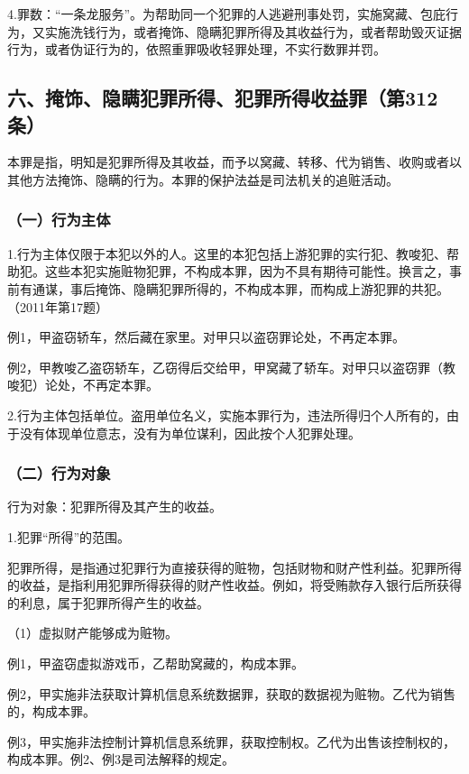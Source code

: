 4.罪数：“一条龙服务”。为帮助同一个犯罪的人逃避刑事处罚，实施窝藏、包庇行为，又实施洗钱行为，或者掩饰、隐瞒犯罪所得及其收益行为，或者帮助毁灭证据行为，或者伪证行为的，依照重罪吸收轻罪处理，不实行数罪并罚。

\subsection*{六、掩饰、隐瞒犯罪所得、犯罪所得收益罪（第312条）}

本罪是指，明知是犯罪所得及其收益，而予以窝藏、转移、代为销售、收购或者以其他方法掩饰、隐瞒的行为。本罪的保护法益是司法机关的追赃活动。

\subsubsection*{（一）行为主体}

1.行为主体仅限于本犯以外的人。这里的本犯包括上游犯罪的实行犯、教唆犯、帮助犯。这些本犯实施赃物犯罪，不构成本罪，因为不具有期待可能性。换言之，事前有通谋，事后掩饰、隐瞒犯罪所得的，不构成本罪，而构成上游犯罪的共犯。（2011年第17题）

例1，甲盗窃轿车，然后藏在家里。对甲只以盗窃罪论处，不再定本罪。

例2，甲教唆乙盗窃轿车，乙窃得后交给甲，甲窝藏了轿车。对甲只以盗窃罪（教唆犯）论处，不再定本罪。

2.行为主体包括单位。盗用单位名义，实施本罪行为，违法所得归个人所有的，由于没有体现单位意志，没有为单位谋利，因此按个人犯罪处理。

\subsubsection*{（二）行为对象}

行为对象：犯罪所得及其产生的收益。

1.犯罪“所得”的范围。

犯罪所得，是指通过犯罪行为直接获得的赃物，包括财物和财产性利益。犯罪所得的收益，是指利用犯罪所得获得的财产性收益。例如，将受贿款存入银行后所获得的利息，属于犯罪所得产生的收益。

（1）虚拟财产能够成为赃物。

例1，甲盗窃虚拟游戏币，乙帮助窝藏的，构成本罪。

例2，甲实施非法获取计算机信息系统数据罪，获取的数据视为赃物。乙代为销售的，构成本罪。

例3，甲实施非法控制计算机信息系统罪，获取控制权。乙代为出售该控制权的，构成本罪。例2、例3是司法解释的规定。

